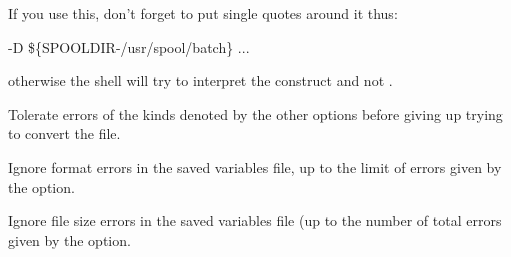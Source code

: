 If you use this, don't forget to put single quotes around it thus:

\begin{expara}

\XbCiconvName{} -D
{\textquotesingle}\$\{SPOOLDIR-/usr/spool/batch\}{\textquotesingle}
...

\end{expara}

otherwise the shell will try to interpret the \exampletext{\$} construct and not \PrXbCiconv{}.


Tolerate  errors of the kinds denoted by the other options before giving up trying to convert the file.


Ignore format errors in the saved variables file, up to the limit of errors given by the  option.


Ignore file size errors in the saved variables file (up to the number of total errors given by the 
option.


